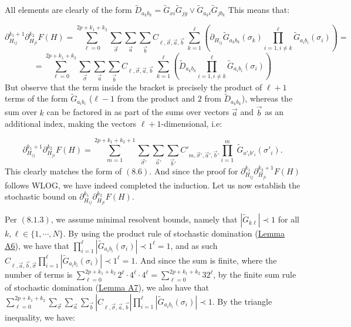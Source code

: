 \documentclass[11pt]{article}
\begin{document}
All elements are clearly of the form $\tilde{D}_{a_k b_k} = \tilde{G}_{xi}\tilde{G}_{jy}\vee \tilde{G}_{a_k i}\tilde{G}_{j b_k}$ This means that: 

$$\partial_{H_{ij}}^{k_1+1}\partial_{H_{ji}}^{k_2} F(H) = \sum_{\ell=0}^{2p+k_1+k_2} \sum_{\vec\sigma}\sum_{\vec a}\sum_{\vec b}C_{\ell, \vec \sigma, \vec a, \vec b}\ \sum_{k=1}^\ell \left(\partial_{H_{ij}} \tilde{G}_{a_k b_k}(\sigma_k) \prod_{i=1,i\neq k}^\ell \tilde{G}_{a_i b_i}(\sigma_i)\right) = $$
$$ = \sum_{\ell=0}^{2p+k_1+k_2} \sum_{\vec\sigma}\sum_{\vec a}\sum_{\vec b}C_{\ell, \vec \sigma, \vec a, \vec b}\ \sum_{k=1}^\ell \left(\tilde{D}_{a_k b_k} \prod_{i=1,i\neq k}^\ell \tilde{G}_{a_i b_i}(\sigma_i)\right)$$
But observe that the term inside the bracket is precisely the product of $\ell+1$ terms of the form $\tilde G_{a_ib_i}$ ($\ell-1$ from the product and $2$ from $\tilde{D}_{a_kb_k}$), whereas the sum over $k$ can be factored in as part of the sums over vectors $\vec a$ and $\vec b$ as an additional index, making the vectors $\ell+1$-dimensional, i.e: 

$$\partial_{H_{ij}}^{k_1+1}\partial_{H_{ji}}^{k_2} F(H) = \sum_{m=1}^{2p+k_1+k_2+1} \sum_{\vec\sigma'}\sum_{\vec a'}\sum_{\vec b'} C'_{m, \vec\sigma', \vec a', \vec b'} \prod_{i=1}^m\ \tilde{G}_{a'_i b'_i}(\sigma'_i).$$
 This clearly matches the form of $(8.6)$. And since the proof for $\partial_{H_{ij}}^{k_1}\partial_{H_{ji}}^{k_2+1} F(H)$ follows WLOG, we have indeed completed the induction. Let us now establish the stochastic bound on $\partial_{H_{ij}}^{k_1}\partial_{H_{ji}}^{k_2} F(H)$. \vspace{0.1 cm}

\noindent  Per $(8.1.3)$, we assume minimal resolvent bounds, namely that $|\tilde{G}_{k\ell}|\prec 1$ for all $k, \ell\in \{1, \cdots, N\}$. By using the product rule of stochastic domination (\hyperref[lemma-a6]{Lemma A6}), we have that $\prod_{i=1}^\ell \left\vert \tilde{G}_{a_ib_i}(\sigma_i)\right\vert \prec 1^\ell = 1$, and as such $C_{\ell, \vec a, \vec b, \vec \sigma}\prod_{i=1}^\ell \left\vert \tilde{G}_{a_ib_i}(\sigma_i)\right\vert \prec 1^\ell = 1$. And since the sum is finite, where the number of terms is $\sum_{\ell=0}^{2p+k_1+k_2} 2^{\ell}\cdot 4^\ell\cdot 4^\ell = \sum_{\ell=0}^{2p+k_1+k_2}32^\ell$, by the finite sum rule of stochastic domination (\hyperref[lemma-a7]{Lemma A7}), we also have that $\sum_{\ell=0}^{2p+k_1+k_2} \sum_{\vec\sigma}\sum_{\vec a}\sum_{\vec b} |C_{\ell, \vec \sigma, \vec a, \vec b}| \prod_{i=1}^\ell\left\vert \tilde{G}_{a_i b_i}(\sigma_i)\right\vert\prec 1$. By the triangle inequality, we have:
\end{document}
